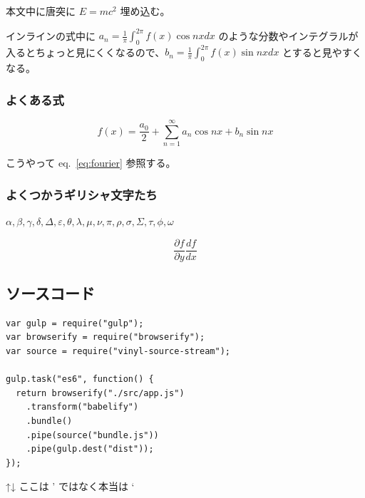 本文中に唐突に \(E = mc^2\) 埋め込む。

インラインの式中に
\(a_n = \frac{1}{\pi} \int_{0}^{2\pi} f(x) \cos nx dx\)
のような分数やインテグラルが入るとちょっと見にくくなるので、\(\displaystyle b_n = \frac{1}{\pi} \int_{0}^{2\pi} f(x) \sin nx dx\)
とすると見やすくなる。

\hypertarget{ux3088ux304fux3042ux308bux5f0f}{%
\subsubsection{よくある式}\label{ux3088ux304fux3042ux308bux5f0f}}

\begin{equation}f(x) = \frac{a_0}{2} + \sum_{n = 1}^{\infty} a_n \cos nx + b_n \sin nx\label{eq:fourier}\end{equation}

こうやって eq.~\ref{eq:fourier} 参照する。

\hypertarget{ux3088ux304fux3064ux304bux3046ux30aeux30eaux30b7ux30e3ux6587ux5b57ux305fux3061}{%
\subsubsection{よくつかうギリシャ文字たち}\label{ux3088ux304fux3064ux304bux3046ux30aeux30eaux30b7ux30e3ux6587ux5b57ux305fux3061}}

\(\alpha, \beta, \gamma, \delta, \Delta, \varepsilon, \theta, \lambda, \mu, \nu, \pi, \rho, \sigma, \Sigma, \tau, \phi, \omega\)

\[\frac{\partial f}{\partial y} \frac{d f}{d x}\]

\hypertarget{ux30bdux30fcux30b9ux30b3ux30fcux30c9}{%
\subsection{ソースコード}\label{ux30bdux30fcux30b9ux30b3ux30fcux30c9}}

\hypertarget{lst:awesome-code}{%
\label{lst:awesome-code}}%
\begin{lstlisting}
var gulp = require("gulp");
var browserify = require("browserify");
var source = require("vinyl-source-stream");

gulp.task("es6", function() {
  return browserify("./src/app.js")
    .transform("babelify")
    .bundle()
    .pipe(source("bundle.js"))
    .pipe(gulp.dest("dist"));
});
\end{lstlisting}

↑↓ ここは ' ではなく本当は `

